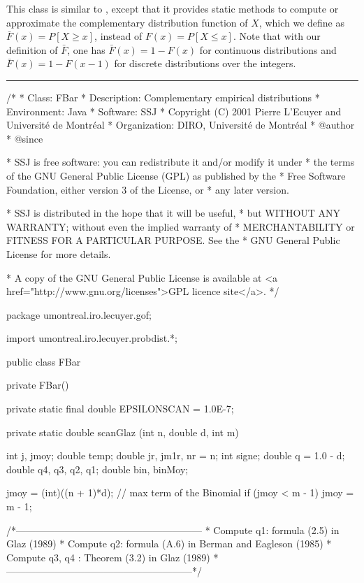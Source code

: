 
This class is similar to , except that it provides static methods
to compute or approximate the complementary distribution function of $X$,
which we define as $\bar F (x) = P[X\ge x]$, instead of $F (x)=P[X\le x]$.
Note that with our definition of $\bar F$, one has
$\bar F (x) = 1 - F (x)$ for continuous distributions and
$\bar F (x) = 1 - F (x-1)$ for discrete distributions over the integers.

\bigskip\hrule

\begin{code}
\begin{hide}
/*
 * Class:        FBar
 * Description:  Complementary empirical distributions
 * Environment:  Java
 * Software:     SSJ 
 * Copyright (C) 2001  Pierre L'Ecuyer and Université de Montréal
 * Organization: DIRO, Université de Montréal
 * @author       
 * @since

 * SSJ is free software: you can redistribute it and/or modify it under
 * the terms of the GNU General Public License (GPL) as published by the
 * Free Software Foundation, either version 3 of the License, or
 * any later version.

 * SSJ is distributed in the hope that it will be useful,
 * but WITHOUT ANY WARRANTY; without even the implied warranty of
 * MERCHANTABILITY or FITNESS FOR A PARTICULAR PURPOSE.  See the
 * GNU General Public License for more details.

 * A copy of the GNU General Public License is available at
   <a href="http://www.gnu.org/licenses">GPL licence site</a>.
 */
\end{hide}
package umontreal.iro.lecuyer.gof;
\begin{hide}
import umontreal.iro.lecuyer.probdist.*;
\end{hide}

public class FBar\begin{hide} {
   private FBar() {}

   private static final double EPSILONSCAN = 1.0E-7;

   private static double scanGlaz (int n, double d, int m) {
      int j, jmoy;
      double temp;
      double jr, jm1r, nr = n;
      int signe;
      double q = 1.0 - d;
      double q4, q3, q2, q1;
      double bin, binMoy;

      jmoy = (int)((n + 1)*d);              // max term of the Binomial
      if (jmoy < m - 1)
         jmoy = m - 1;

      /*---------------------------------------------------------
       * Compute q1: formula (2.5) in Glaz (1989)
       * Compute q2: formula (A.6) in Berman and Eagleson (1985)
       * Compute q3, q4 : Theorem (3.2) in Glaz (1989)
       *---------------------------------------------------------*/

}}
\end{hide}
\end{code}
